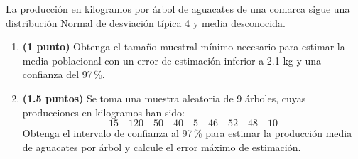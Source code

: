 
La producción en kilogramos por árbol de aguacates de una comarca sigue una
distribución Normal de desviación típica 4 y media desconocida.
\begin{enumerate}[label=\alph*)]
  \item \textbf{(1 punto)} Obtenga el tamaño muestral mínimo necesario para
  estimar la media poblacional con un error de estimación inferior a 2.1 kg
  y una confianza del 97\,\%.
  \item \textbf{(1.5 puntos)} Se toma una muestra aleatoria de 9 árboles,
  cuyas producciones en kilogramos han sido:
  \[
    15\quad 120\quad 50\quad 40\quad 5\quad 46\quad 52\quad 48\quad 10
  \]
  Obtenga el intervalo de confianza al 97\,\% para estimar la producción
  media de aguacates por árbol y calcule el error máximo de estimación.
\end{enumerate}
